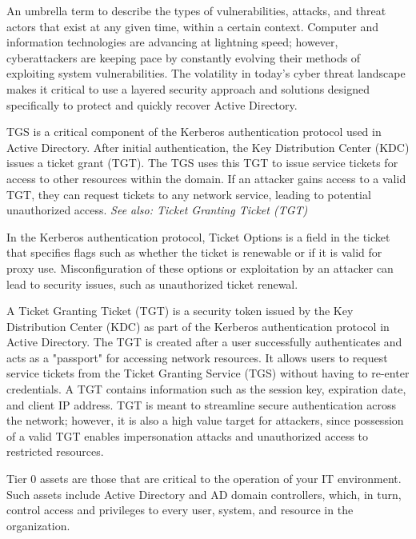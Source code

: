  An umbrella term to describe the types of vulnerabilities, attacks, and threat actors that exist at any given time, within a certain context. Computer and information technologies are advancing at lightning speed; however, cyberattackers are keeping pace by constantly evolving their methods of exploiting system vulnerabilities. The volatility in today’s cyber threat landscape makes it critical to use a layered security approach and solutions designed specifically to protect and quickly recover Active Directory.

 TGS is a critical component of the Kerberos authentication protocol used in Active Directory. After initial authentication, the Key Distribution Center (KDC) issues a ticket grant (TGT). The TGS uses this TGT to issue service tickets for access to other resources within the domain. If an attacker gains access to a valid TGT, they can request tickets to any network service, leading to potential unauthorized access.
\textit{See also: Ticket Granting Ticket (TGT)}

 In the Kerberos authentication protocol, Ticket Options is a field in the ticket that specifies flags such as whether the ticket is renewable or if it is valid for proxy use. Misconfiguration of these options or exploitation by an attacker can lead to security issues, such as unauthorized ticket renewal.

 A Ticket Granting Ticket (TGT) is a security token issued by the Key Distribution Center (KDC) as part of the Kerberos authentication protocol in Active Directory. The TGT is created after a user successfully authenticates and acts as a "passport" for accessing network resources. It allows users to request service tickets from the Ticket Granting Service (TGS) without having to re-enter credentials. A TGT contains information such as the session key, expiration date, and client IP address. TGT is meant to streamline secure authentication across the network; however, it is also a high value target for attackers, since possession of a valid TGT enables impersonation attacks and unauthorized access to restricted resources.

 Tier 0 assets are those that are critical to the operation of your IT environment. Such assets include Active Directory and AD domain controllers, which, in turn, control access and privileges to every user, system, and resource in the organization.

